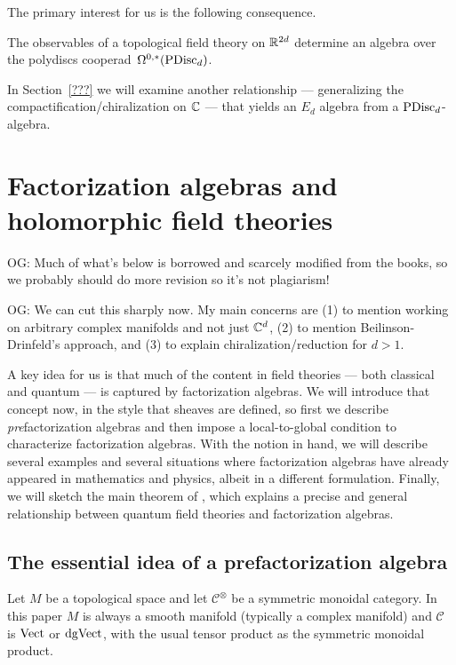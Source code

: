\documentclass[11pt]{amsart}
\def\mc{\mathcal}
\def\owen#1{{\textcolor{violet!65!black}{OG: {#1}}}}
\begin{document}
The primary interest for us is the following consequence.

\begin{cor}
The observables of a topological field theory on $\mathbb R^{2d}$ determine an algebra over the polydiscs cooperad~$\Omega^{0,*}({\rm PDisc}_d)$.
\end{cor}

In Section~\ref{???} we will examine another relationship --- generalizing the compactification/chiralization on $\mathbb C$ --- that yields an $E_d$ algebra from a ${\rm PDisc}_d$-algebra.


\section{Factorization algebras and holomorphic field theories}
\label{prefactorization_algebras}

\owen{Much of what's below is borrowed and scarcely modified from the books, so we probably should do more revision so it's not plagiarism!}

\owen{We can cut this sharply now. My main concerns are (1) to mention working on arbitrary complex manifolds and not just $\mathbb C^d$, (2) to mention Beilinson-Drinfeld's approach, and (3) to explain chiralization/reduction for $d > 1$.}

A key idea for us is that much of the content in field theories --- both classical and quantum --- is captured by factorization algebras.
We will introduce that concept now, in the style that sheaves are defined, so first we describe {\em pre}\/factorization algebras and then impose a local-to-global condition to characterize factorization algebras.
With the notion in hand, we will describe several examples and several situations where factorization algebras have already appeared in mathematics and physics, 
albeit in a different formulation.
Finally, we will sketch the main theorem of \cite{CG2}, 
which explains a precise and general relationship between quantum field theories and factorization algebras.

\subsection{The essential idea of a prefactorization algebra}

Let $M$ be a topological space and let $\mc{C}^\otimes$ be a symmetric monoidal category. 
In this paper $M$ is always a smooth manifold (typically a complex manifold) and $\mc{C}$ is ${\rm Vect}$ or ${\rm dgVect}$, with the usual tensor product as the symmetric monoidal product.
\end{document}
